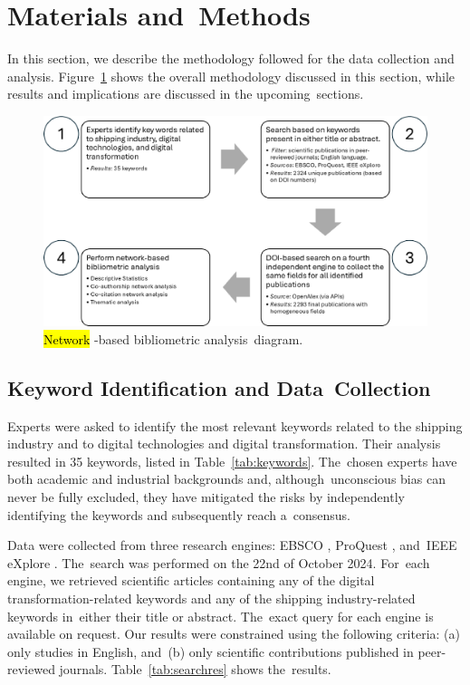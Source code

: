 \documentclass[jmse,review,accept,pdftex,moreauthors]{Definitions/mdpi}
\begin{document}
\section{Materials and~Methods}
In this section, we describe the methodology followed for the data collection and analysis. Figure~\ref{fig:fig0} shows the overall methodology discussed in this section, while results and implications are discussed in the upcoming~sections.


\begin{figure}[H]

	\includegraphics[width=\linewidth]{pics/overall_diagram.eps}
	\caption{\hl{Network}%
-based bibliometric analysis~diagram.}\label{fig:fig0}
\end{figure}
\unskip

\subsection{Keyword Identification and Data~Collection}
Experts were asked to identify the most relevant keywords related to the shipping industry and to digital technologies and digital transformation. Their analysis resulted in 35 keywords, listed in Table~\ref{tab:keywords}. The~chosen experts have both academic and industrial backgrounds and, although~unconscious bias can never be fully excluded, they have mitigated the risks by independently identifying the keywords and subsequently reach a~consensus.



Data were collected from three research engines: EBSCO \citep{vaughan2011ebsco}, ProQuest \citep{cooke2017proquest}, and~IEEE eXplore \citep{wilde2016ieee}. The~search was performed on the 22nd of October 2024. For~each engine, we retrieved scientific articles containing any of the digital transformation-related keywords and any of the shipping industry-related keywords in~either their title or abstract. The~exact query for each engine is available on request. Our results were constrained using the following criteria: (a) only studies in English, and~(b) only scientific contributions published in peer-reviewed journals. Table~\ref{tab:searchres} shows the~results.
\end{document}

